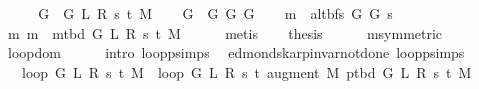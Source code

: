 \begin{isabellebody}
%
\endisadeliminvisible
%
\isadelimproof
%
\endisadelimproof
%
\isatagproof
{}\isamarkupfalse%
\ {\isacharminus}{\kern0pt}\isanewline
\ \ \isamarkupfalse%
\ {\isacharquery}{\kern0pt}G{}\ {\isacharequal}{\kern0pt}\ {\isachardoublequoteopen}G{}\ L\ R\ s\ t\ M{\isachardoublequoteclose}\isanewline
\ \ \isamarkupfalse%
\ {\isacharquery}{\kern0pt}G{}\ {\isacharequal}{\kern0pt}\ {\isachardoublequoteopen}G{}\ G\ {\isacharquery}{\kern0pt}G{}{\isachardoublequoteclose}\isanewline
\ \ \isamarkupfalse%
\ {\isacharquery}{\kern0pt}m\ {\isacharequal}{\kern0pt}\ {\isachardoublequoteopen}alt{\isacharunderscore}{\kern0pt}bfs\ {\isacharquery}{\kern0pt}G{}\ {\isacharquery}{\kern0pt}G{}\ s{\isachardoublequoteclose}\isanewline
\ \ \isamarkupfalse%
\ m{\isacharcolon}{\kern0pt}\ {\isachardoublequoteopen}{\isacharquery}{\kern0pt}m\ {\isacharequal}{\kern0pt}\ m{\isacharunderscore}{\kern0pt}tbd\ G\ L\ R\ s\ t\ M{\isachardoublequoteclose}\isanewline
\ \ \ \ \isamarkupfalse%
\ metis\isanewline
\ \ \isamarkupfalse%
\ {\isacharquery}{\kern0pt}thesis\isanewline
\ \ \ \ \isamarkupfalse%
\ m{\isacharbrackleft}{\kern0pt}symmetric{\isacharbrackright}{\kern0pt}\isanewline
\ \ \ \ \isamarkupfalse%
\ loop{\isacharprime}{\kern0pt}{\isacharunderscore}{\kern0pt}dom\isanewline
\ \ \ \ \isamarkupfalse%
\ {\isacharparenleft}{\kern0pt}intro\ loop{\isacharprime}{\kern0pt}{\isachardot}{\kern0pt}psimps{\isacharparenright}{\kern0pt}\isanewline
{}\isamarkupfalse%
%
\endisatagproof
{\isafoldproof}%
%
\isadelimproof
\isanewline
%
\endisadelimproof
%
\isadeliminvisible
\isanewline
%
\endisadeliminvisible
%
\isataginvisible
{}\isamarkupfalse%
\ {\isacharparenleft}{\kern0pt}\ edmonds{\isacharunderscore}{\kern0pt}karp{\isacharunderscore}{\kern0pt}invar{\isacharunderscore}{\kern0pt}not{\isacharunderscore}{\kern0pt}done{\isacharunderscore}{\kern0pt}{}{\isacharparenright}{\kern0pt}\ loop{\isacharprime}{\kern0pt}{\isacharunderscore}{\kern0pt}psimps{\isacharcolon}{\kern0pt}\isanewline
\ \ \ {\isachardoublequoteopen}loop{\isacharprime}{\kern0pt}\ G\ L\ R\ s\ t\ M\ {\isacharequal}{\kern0pt}\ loop{\isacharprime}{\kern0pt}\ G\ L\ R\ s\ t\ {\isacharparenleft}{\kern0pt}augment\ M\ {\isacharparenleft}{\kern0pt}p{\isacharunderscore}{\kern0pt}tbd\ G\ L\ R\ s\ t\ M{\isacharparenright}{\kern0pt}{\isacharparenright}{\kern0pt}{\isachardoublequoteclose}%

\end{isabellebody}
